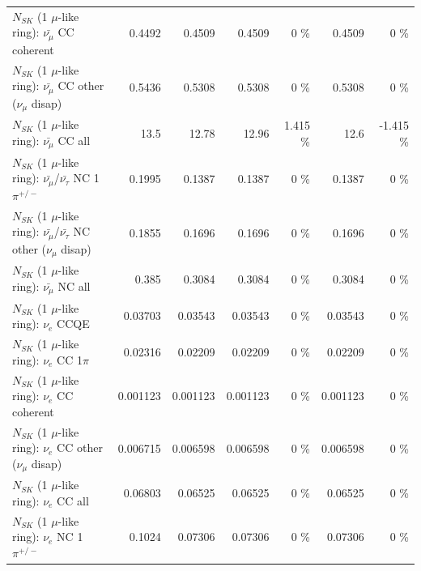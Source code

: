 \begin{table}
\begin{tabular}{| l | r | r | r  r | r  r |}
                       $N_{SK}$ (1 $\mu$-like ring): $\bar{\nu_\mu}$ CC coherent &          0.4492 &          0.4509 &          0.4509 &        0 \%  &          0.4509 &        0 \%  \\ 
        $N_{SK}$ (1 $\mu$-like ring): $\bar{\nu_\mu}$ CC other ($\nu_\mu$ disap) &          0.5436 &          0.5308 &          0.5308 &        0 \%  &          0.5308 &        0 \%  \\ 
                          $N_{SK}$ (1 $\mu$-like ring): $\bar{\nu_{\mu}}$ CC all &            13.5 &           12.78 &           12.96 &    1.415 \%  &            12.6 &   -1.415 \%  \\ 
\hline
  $N_{SK}$ (1 $\mu$-like ring): $\bar{\nu_\mu}$/$\bar{\nu_\tau}$ NC 1$\pi^{+/-}$ &          0.1995 &          0.1387 &          0.1387 &        0 \%  &          0.1387 &        0 \%  \\ 
$N_{SK}$ (1 $\mu$-like ring): $\bar{\nu_\mu}$/$\bar{\nu_\tau}$ NC other ($\nu_\mu$ disap) &          0.1855 &          0.1696 &          0.1696 &        0 \%  &          0.1696 &        0 \%  \\ 
                          $N_{SK}$ (1 $\mu$-like ring): $\bar{\nu_{\mu}}$ NC all &           0.385 &          0.3084 &          0.3084 &        0 \%  &          0.3084 &        0 \%  \\ 
\hline
\hline
\hline
                                      $N_{SK}$ (1 $\mu$-like ring): $\nu_e$ CCQE &         0.03703 &         0.03543 &         0.03543 &        0 \%  &         0.03543 &        0 \%  \\ 
                                 $N_{SK}$ (1 $\mu$-like ring): $\nu_e$ CC 1$\pi$ &         0.02316 &         0.02209 &         0.02209 &        0 \%  &         0.02209 &        0 \%  \\ 
                               $N_{SK}$ (1 $\mu$-like ring): $\nu_e$ CC coherent &        0.001123 &        0.001123 &        0.001123 &        0 \%  &        0.001123 &        0 \%  \\ 
                $N_{SK}$ (1 $\mu$-like ring): $\nu_e$ CC other ($\nu_\mu$ disap) &        0.006715 &        0.006598 &        0.006598 &        0 \%  &        0.006598 &        0 \%  \\ 
                                  $N_{SK}$ (1 $\mu$-like ring): $\nu_{e}$ CC all &         0.06803 &         0.06525 &         0.06525 &        0 \%  &         0.06525 &        0 \%  \\ 
\hline
                           $N_{SK}$ (1 $\mu$-like ring): $\nu_e$ NC 1$\pi^{+/-}$ &          0.1024 &         0.07306 &         0.07306 &        0 \%  &         0.07306 &        0 \%  \\ 

\end{tabular}
\end{table}
